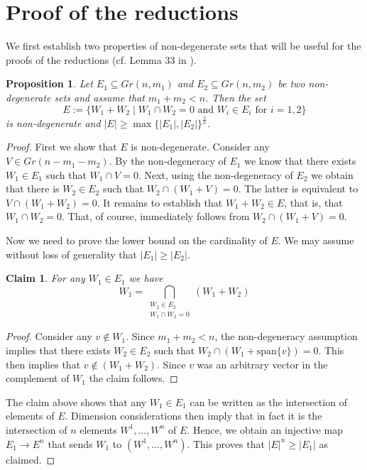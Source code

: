 \documentclass{amsart}
\newtheorem{proposition}[theorem]{Proposition}
\newtheorem{claim}[theorem]{Claim}
\begin{document}
\section{Proof of the reductions}
We first establish two properties of non-degenerate sets that will be useful for the proofs of the reductions (cf. Lemma 33 in \cite{He18}).

\begin{proposition}\label{SumofSubspacesProposition}
    Let $E_1 \subseteq Gr(n, m_1)$ and $E_2 \subseteq Gr(n, m_2)$ be two non-degenerate sets and assume that $m_1 + m_2 < n$. Then the set $$E := \{W_1 + W_2 \mid W_1 \cap W_2 = 0 \text{ and } W_i \in E_i \text{ for } i = 1, 2\}$$ is non-degenerate and $|E| \geq \max\{|E_1|, |E_2|\}^\frac{1}{n}$.
\end{proposition}

\begin{proof}
    First we show that $E$ is non-degenerate. Consider any $V \in Gr(n - m_1 - m_2)$. By the non-degeneracy of $E_1$ we know that there exists $W_1 \in E_1$ such that $W_1 \cap V = 0$. Next, using the non-degeneracy of $E_2$ we obtain that there is $W_2 \in E_2$ such that $W_2 \cap (W_1 + V) = 0$. The latter is equivalent to $V \cap (W_1 + W_2) = 0$. It remains to establish that $W_1 + W_2 \in E$, that is, that $W_1 \cap W_2 = 0$. That, of course, immediately follows from $W_2 \cap (W_1 + V) = 0$.

    Now we need to prove the lower bound on the cardinality of $E$. We may assume without loss of generality that $|E_1| \geq |E_2|$.
    \begin{claim}
        For any $W_1 \in E_1$ we have 
        $$W_1 = \bigcap_{\substack{W_2 \in E_2 \\ W_1 \cap W_2 = 0}}(W_1 + W_2)$$
    \end{claim}
    \begin{proof}
        Consider any $v \not \in W_1$. Since $m_1 + m_2 < n$, the non-degeneracy assumption implies that there exists $W_2 \in E_2$ such that $W_2 \cap (W_1 + \text{span} \{v\}) = 0$. This then implies that $v \not \in (W_1 + W_2)$. Since $v$ was an arbitrary vector in the complement of $W_1$ the claim follows.
    \end{proof}
    The claim above shows that any $W_1 \in E_1$ can be written as the intersection of elements of $E$. Dimension considerations then imply that in fact it is the intersection of $n$ elements $W^1, \ldots, W^n$ of $E$. Hence, we obtain an injective map $E_1 \to E^n$ that sends $W_1$ to $(W^1, \ldots, W^n)$. This proves that $|E|^n \geq |E_1|$ as claimed.
\end{proof}
\end{document}

